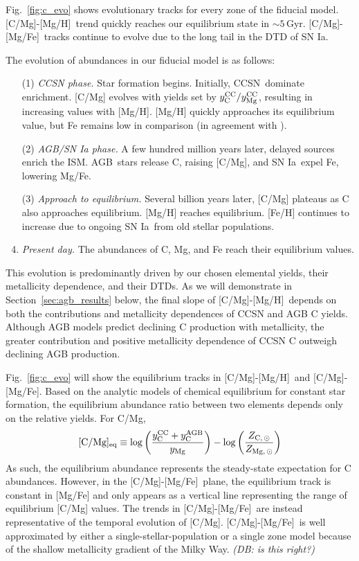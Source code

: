 \documentclass[fleqn,
usenatbib]{mnras}
\makeatletter
\newcommand{\agb}{AGB}
\newcommand{\cc}{CCSN}
\newcommand{\ia}{SN Ia}
\newcommand{\caah}{[C/Mg]-[Mg/H]}
\newcommand{\caafe}{[C/Mg]-[Mg/Fe]}
\newcommand{\Ycc}{{y_{\rm C}^{\rm CC}}}
\newcommand{\Yoc}{{y_{\rm Mg}^{\rm CC}}}
\newcommand{\Ycagb}{{y_{\rm C}^{\rm AGB}}}
\newcommand{\about}[1]{${\sim} #1$}
\DeclareRobustCommand\citepos
  {\begingroup
   \let\NAT@nmfmt\NAT@posfmt%
   \NAT@swafalse\let\NAT@ctype\z@\NAT@partrue
   \@ifstar{\NAT@fulltrue\NAT@citetp}{\NAT@fullfalse\NAT@citetp}}
\let\NAT@orig@nmfmt\NAT@nmfmt
\def\NAT@posfmt#1{\NAT@orig@nmfmt{#1's}}
\newcommand{\dbnote}[1]{ {\color{Thistle} \textit{\small (DB: #1)}} }
\makeatother
\begin{document}
Fig.~\ref{fig:c_evo} shows evolutionary tracks for every zone of the fiducial model.
\caah\ trend quickly reaches our equilibrium state in \about{5}\,Gyr. \caafe\ tracks continue to evolve due to the long tail in the DTD of \ia. 


The evolution of abundances in our fiducial model is as follows:
\begin{enumerate}
    \item[(1)] {\it CCSN phase.} Star formation begins. Initially, \cc\ dominate enrichment. [C/Mg] evolves with yields set by $\Ycc/\Yoc$, resulting in increasing values with [Mg/H].  [Mg/H] quickly approaches its equilibrium value, but Fe remains low in comparison (in agreement with \citealt{WAF17}).
    \item[(2)]  {\it AGB/SN Ia phase.} A few hundred million years later, delayed sources enrich the ISM. \agb\ stars release C, raising [C/Mg], and \ia\ expel Fe, lowering Mg/Fe. 
    \item[(3)] {\it Approach to equilibrium.} Several billion years later, [C/Mg] plateaus as C also approaches equilibrium. [Mg/H] reaches equilibrium. [Fe/H] continues to increase due to ongoing \ia\ from old stellar populations. 
    \item {\it Present day.} The abundances of C, Mg, and Fe reach their equilibrium values. 

\end{enumerate}
This evolution is predominantly driven by our chosen elemental yields, their
metallicity dependence, and their DTDs.
As we will demonstrate in Section~\ref{sec:agb_results} below, the final slope of \caah\ depends on both the contributions and metallicity dependences of CCSN and AGB C yields. Although AGB models predict declining C production with metallicity, the greater contribution and positive metallicity dependence of CCSN C outweigh declining AGB production.



 Fig.~\ref{fig:c_evo} {\color{red} will} show the  equilibrium tracks in \caah\, and \caafe. Based on the \citepos{WAF17} analytic models of chemical equilibrium for constant star formation, the equilibrium abundance ratio between two elements depends only on the relative yields. For C/Mg, 
\begin{equation}\label{eq:equilibrium_yields}
    {\rm [C/Mg]_{eq}} \equiv \log \left(\frac{\Ycc + \Ycagb }{y_{\rm Mg}}\right) - \log \left(\frac{Z_{\rm C,\,\odot}}{Z_{\rm Mg,\,\odot}}\right)
\end{equation}
As such, the equilibrium abundance represents the steady-state expectation for C abundances.  
However, in the \caafe\ plane, the equilibrium track is constant in [Mg/Fe] and only appears as a vertical line representing the range of equilibrium [C/Mg] values. The trends in \caafe\ are instead representative of the temporal evolution of [C/Mg].  \caafe\ is well approximated by either a single-stellar-population or a single zone model because of the shallow metallicity gradient of the Milky Way. \dbnote{is this right?}
\end{document}
